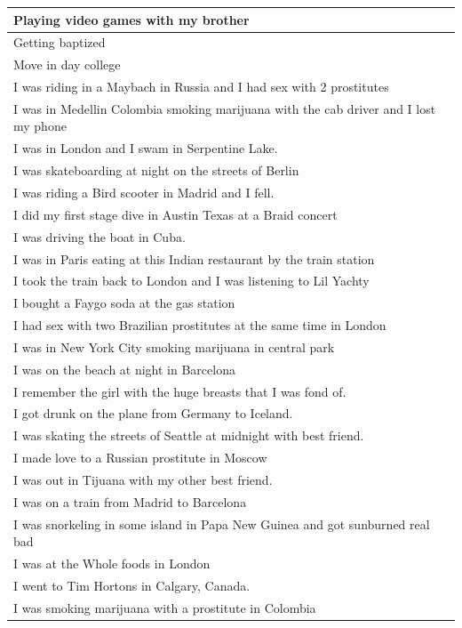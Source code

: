 \documentclass[
  .7em,
  letterpaper,
  DIV=11,
  numbers=noendperiod]{scrartcl}
\begin{document}
\begin{table}
\begin{tabular}{l}
\hline
Playing video games with my brother\\
\hline
Getting baptized\\
\hline
Move in day college\\
\hline
I was riding in a Maybach in Russia and I had sex with 2 prostitutes\\
\hline
I was in Medellin Colombia smoking marijuana with the cab driver and I lost my phone\\
\hline
I was in London and I swam in Serpentine Lake.\\
\hline
I was skateboarding at night on the streets of Berlin\\
\hline
I was riding a Bird scooter in Madrid and I fell.\\
\hline
I did my first stage dive in Austin Texas at a Braid concert\\
\hline
I was driving the boat in Cuba.\\
\hline
I was in Paris eating at this Indian restaurant by the train station\\
\hline
I took the train back to London and I was listening to Lil Yachty\\
\hline
I bought a Faygo soda at the gas station\\
\hline
I had sex with two Brazilian prostitutes at the same time in London\\
\hline
I was in New York City smoking marijuana in central park\\
\hline
I was on the beach at night in Barcelona\\
\hline
I remember the girl with the huge breasts that I was fond of.\\
\hline
I got drunk on the plane from Germany to Iceland.\\
\hline
I was skating the streets of Seattle at midnight with best friend.\\
\hline
I made love to a Russian prostitute in Moscow\\
\hline
I was out in Tijuana with my other best friend.\\
\hline
I was on a train from Madrid to Barcelona\\
\hline
I was snorkeling in some island in Papa New Guinea and got sunburned real bad\\
\hline
I was at the Whole foods in London\\
\hline
I went to Tim Hortons in Calgary, Canada.\\
\hline
I was smoking marijuana with a prostitute in Colombia\\

\end{tabular}
\end{table}
\end{document}

